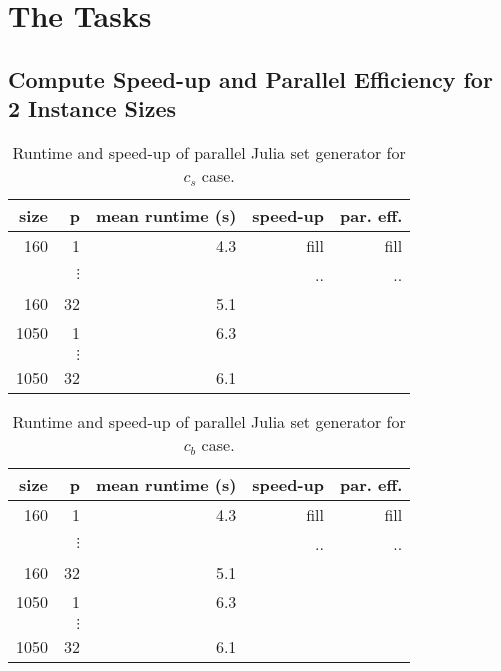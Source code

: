 \documentclass[a4paper,%
11pt,%
DIV12,
headsepline,%
headings=normal,
]{scrartcl}
\begin{document}
\maketitlepage




\setcounter{section}{1}
\section{The Tasks}

\setcounter{subsection}{1}
\subsection{Compute Speed-up and Parallel Efficiency for 2 Instance Sizes }

\def\sizes{160}
\def\sizel{1050}

\begin{table}[htb]
 \centering 
\caption{\label{tab:runtime_cs}Runtime and speed-up of parallel Julia set generator for $c_s$ case.}
\begin{tabular}{rrrrr}
  \toprule
  size & p & mean runtime (s) & speed-up & par. eff.\\
  \midrule
  \sizes & 1 & 4.3 & fill & fill \\
    & $\vdots$ &  & .. & .. \\
  \sizes & 32 & 5.1 &  \\
  \sizel & 1 & 6.3 \\
    & $\vdots$ &  \\
  \sizel & 32 & 6.1 \\
  \bottomrule
\end{tabular}
\end{table}

\begin{table}[htb]
 \centering 
\caption{\label{tab:runtime_cb}Runtime and speed-up of parallel Julia set generator for $c_b$ case.}
\begin{tabular}{rrrrr}
  \toprule
  size & p & mean runtime (s) & speed-up & par. eff.\\
  \midrule
  \sizes & 1 & 4.3 & fill & fill \\
    & $\vdots$ &  & .. & .. \\
  \sizes & 32 & 5.1 &  \\
  \sizel & 1 & 6.3 \\
    & $\vdots$ &  \\
  \sizel & 32 & 6.1 \\
  \bottomrule
\end{tabular}
\end{table}
\end{document}
